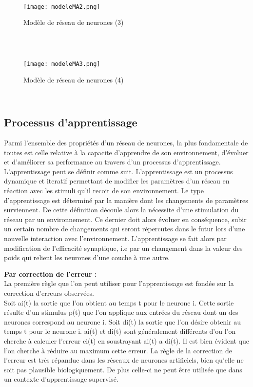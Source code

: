 \documentclass{article}
\begin{document}
\\
    \begin{figure}[hp]
	    \centering
	    \texttt{[image: modeleMA2.png]}
	    \caption{Modèle de réseau de neurones (3)}
    \end{figure}
\\
\\
    \begin{figure}[hp]
	    \centering
	    \texttt{[image: modeleMA3.png]}
	    \caption{Modèle de réseau de neurones (4)}
    \end{figure}
\\

                \subsection{Processus d'apprentissage }
Parmi l’ensemble des propriétés d’un réseau de neurones, la plus fondamentale de toutes est celle relative à la capacite d’apprendre de son environnement, d’évoluer et d’améliorer sa performance au travers d’un processus d’apprentissage. L’apprentissage peut se définir comme suit.
L’apprentissage est un processus dynamique et iteratif permettant de modifier les paramètres
d’un réseau en réaction avec les stimuli qu’il recoit de son environnement. Le type d’apprentissage est déterminé par la manière dont les changements de paramètres surviennent.
De cette définition découle alors la nécessite d’une stimulation du réseau par un environnement.
Ce dernier doit alors évoluer en conséquence, subir un certain nombre de changements qui seront répercutes dans le futur lors d’une nouvelle interaction avec l’environnement. L’apprentissage se fait alors par modification de l’efficacité synaptique, i.e par un changement dans la valeur des poids qui relient les neurones d’une couche à une autre.


\textbf{Par correction de l'erreur :}\\

La première règle que l’on peut utiliser pour l’apprentissage est fondée sur la correction
d’erreurs observées.\\
Soit ai(t) la sortie que l’on obtient au temps t pour le neurone i. Cette sortie résulte d’un stimulus p(t) que l’on applique aux entrées du réseau dont un des neurones correspond au neurone i. Soit di(t) la sortie que l’on désire obtenir au temps t pour le neurone i. ai(t) et di(t) sont généralement différents d’ou l’on cherche à calculer l’erreur ei(t) en soustrayant ai(t) a di(t). Il est bien évident que l’on cherche à réduire au maximum cette erreur. La règle de la correction de l’erreur est très répandue dans les réseaux de neurones artificiels, bien qu’elle ne soit pas plausible biologiquement. De plus celle-ci ne peut être utilisée que dans un contexte d’apprentissage supervisé.\\
\end{document}
